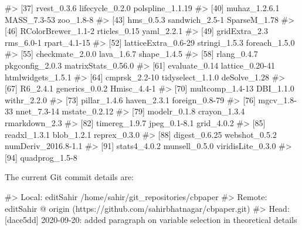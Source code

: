 \documentclass[
]{jss}
\begin{document}
\begin{CodeChunk}
\begin{CodeOutput}
#> [37] rvest_0.3.6         lifecycle_0.2.0     polspline_1.1.19   
#> [40] muhaz_1.2.6.1       MASS_7.3-53         zoo_1.8-8          
#> [43] hms_0.5.3           sandwich_2.5-1      SparseM_1.78       
#> [46] RColorBrewer_1.1-2  rticles_0.15        yaml_2.2.1         
#> [49] gridExtra_2.3       rms_6.0-1           rpart_4.1-15       
#> [52] latticeExtra_0.6-29 stringi_1.5.3       foreach_1.5.0      
#> [55] checkmate_2.0.0     lava_1.6.7          shape_1.4.5        
#> [58] rlang_0.4.7         pkgconfig_2.0.3     matrixStats_0.56.0 
#> [61] evaluate_0.14       lattice_0.20-41     htmlwidgets_1.5.1  
#> [64] cmprsk_2.2-10       tidyselect_1.1.0    deSolve_1.28       
#> [67] R6_2.4.1            generics_0.0.2      Hmisc_4.4-1        
#> [70] multcomp_1.4-13     DBI_1.1.0           withr_2.2.0        
#> [73] pillar_1.4.6        haven_2.3.1         foreign_0.8-79     
#> [76] mgcv_1.8-33         nnet_7.3-14         mstate_0.2.12      
#> [79] modelr_0.1.8        crayon_1.3.4        rmarkdown_2.3      
#> [82] timereg_1.9.7       jpeg_0.1-8.1        grid_4.0.2         
#> [85] readxl_1.3.1        blob_1.2.1          reprex_0.3.0       
#> [88] digest_0.6.25       webshot_0.5.2       numDeriv_2016.8-1.1
#> [91] stats4_4.0.2        munsell_0.5.0       viridisLite_0.3.0  
#> [94] quadprog_1.5-8
\end{CodeOutput}
\end{CodeChunk}

The current Git commit details are:

\begin{CodeChunk}

\begin{CodeOutput}
#> Local:    editSahir /home/sahir/git_repositories/cbpaper
#> Remote:   editSahir @ origin (https://github.com/sahirbhatnagar/cbpaper.git)
#> Head:     [dace5dd] 2020-09-20: added paragraph on variable selection in theoretical details
\end{CodeOutput}
\end{CodeChunk}


\end{document}

